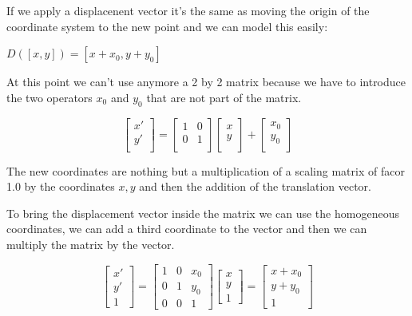 If we apply a displacenent vector it's the same as moving the origin of the coordinate system to the new point and we can model this easily:

\( D([x, y]) = [x + x_0, y + y_0] \)

At this point we can't use anymore a 2 by 2 matrix because we have to introduce the two operators \( x_0 \) and \( y_0 \) that are not part of the matrix. 

\[
    \begin{bmatrix}
        x' \\
        y' \\
        \end{bmatrix}
        =
        \begin{bmatrix}
        1 & 0  \\
        0 & 1  \\
        \end{bmatrix}
        \begin{bmatrix}
        x \\
        y \\
        \end{bmatrix}
        +
        \begin{bmatrix}
            x_0 \\
            y_0 \\
        \end{bmatrix}
\]

The new coordinates are nothing but a multiplication of a scaling matrix of facor 1.0 by the coordinates \(x, y\) and then the addition of the translation vector.


To bring the displacement vector inside the matrix we can use the homogeneous coordinates, we can add a third coordinate to the vector and then we can multiply the matrix by the vector.

\[
    \begin{bmatrix}
        x' \\
        y' \\
        1
        \end{bmatrix}
        =
        \begin{bmatrix}
        1 & 0 & x_0 \\
        0 & 1 & y_0 \\
        0 & 0 & 1
        \end{bmatrix}
        \begin{bmatrix}
        x \\
        y \\
        1
        \end{bmatrix}
        =
        \begin{bmatrix}
        x + x_0 \\
        y + y_0 \\
        1
        \end{bmatrix}
\]


